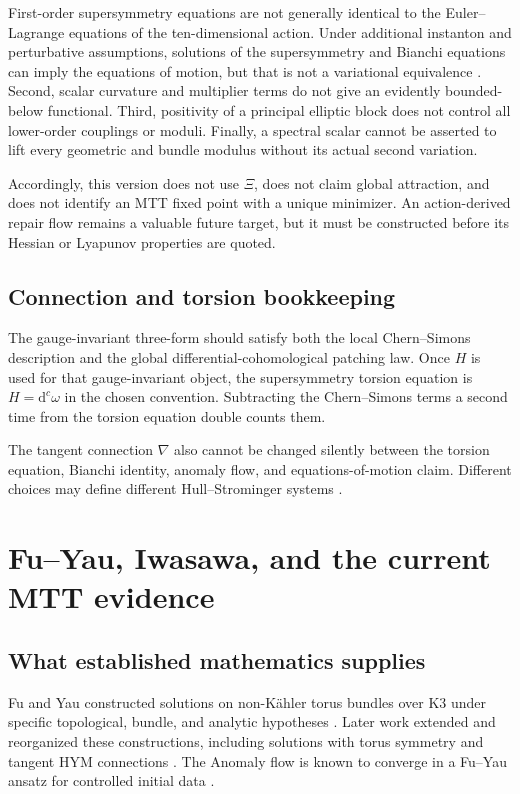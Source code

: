 \documentclass[11pt]{article}
\theoremstyle{definition}
\theoremstyle{remark}
\newcommand{\dd}{\mathrm d}
\begin{document}
First-order supersymmetry equations are not generally identical to the
Euler--Lagrange equations of the ten-dimensional action.  Under additional
instanton and perturbative assumptions, solutions of the supersymmetry and
Bianchi equations can imply the equations of motion, but that is not a
variational equivalence \cite{DelaOssaSvanes2014,AndreasGarciaFernandez2012}.
Second, scalar curvature and multiplier terms do not give an evidently
bounded-below functional.  Third, positivity of a principal elliptic block
does not control all lower-order couplings or moduli.  Finally, a spectral
scalar cannot be asserted to lift every geometric and bundle modulus without
its actual second variation.

Accordingly, this version does not use \(\Xi\), does not claim global
attraction, and does not identify an MTT fixed point with a unique minimizer.
An action-derived repair flow remains a valuable future target, but it must be
constructed before its Hessian or Lyapunov properties are quoted.

\subsection{Connection and torsion bookkeeping}

The gauge-invariant three-form should satisfy both the local Chern--Simons
description and the global differential-cohomological patching law.  Once
\(H\) is used for that gauge-invariant object, the supersymmetry torsion
equation is \(H=\dd^c\omega\) in the chosen convention.  Subtracting the
Chern--Simons terms a second time from the torsion equation double counts
them.

The tangent connection \(\nabla\) also cannot be changed silently between the
torsion equation, Bianchi identity, anomaly flow, and equations-of-motion
claim.  Different choices may define different Hull--Strominger systems
\cite{GarciaFernandez2019}.

\section{Fu--Yau, Iwasawa, and the current MTT evidence}
\label{sec:evidence}

\subsection{What established mathematics supplies}

Fu and Yau constructed solutions on non-K\"ahler torus bundles over K3 under
specific topological, bundle, and analytic hypotheses
\cite{FuYau2008}.  Later work extended and reorganized these constructions,
including solutions with torus symmetry and tangent HYM connections
\cite{FinoGrantcharovVezzoni2021,GarciaFernandez2019}.  The Anomaly flow is
known to converge in a Fu--Yau ansatz for controlled initial data
\cite{PhongPicardZhang2018}.
\end{document}
